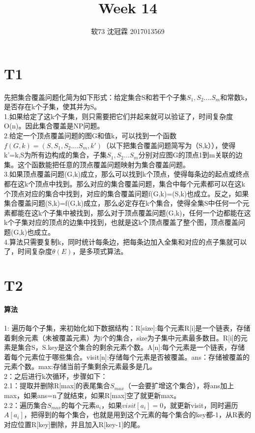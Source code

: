 \documentclass{article}
\title{Week 14}
\author{软73 沈冠霖 2017013569}
\begin{document}
\begin{CJK}{UTF8}{gkai}
\maketitle
\section{T1}
先把集合覆盖问题化简为如下形式：给定集合S和若干个子集$S_{1},S_{2}....S_{m}$和常数k，是否存在k个子集，使其并为S。\\
1.如果给定了这k个子集，则只需要把它们并起来就可以验证了，时间复杂度O(n)。因此集合覆盖是NP问题。\\
2.给定一个顶点覆盖问题的图G和值k，可以找到一个函数$f(G,k)=(S,S_{1},S_{2}....S_{m},k')$（以下把集合覆盖问题简写为（S,k）），使得k'=k,S为所有边构成的集合，子集$S_{1},S_{2}...S_{m}$分别对应图G的顶点1到m关联的边集。这个函数能把任意的顶点覆盖问题映射为集合覆盖问题。\\
3.如果顶点覆盖问题(G,k)成立，那么可以找到k个顶点，使得每条边的起点或终点都在这k个顶点中找到。那么对应的集合覆盖问题，集合中每个元素都可以在这k个顶点对应的集合中找到，对应的集合覆盖问题f(G,k)=(S,k)也成立。反之，如果集合覆盖问题(S,k)=f(G,k)成立，那么必定存在k个集合，使得全集S中任何一个元素都能在这k个子集中被找到，那么对于顶点覆盖问题(G,k)，任何一个边都能在这k个子集对应的顶点的边集中找到，也就是这k个顶点覆盖了整个图，顶点覆盖问题(G,k)也成立。\\
4.算法只需要复制k，同时统计每条边，把每条边加入全集和对应的点子集就可以了，时间复杂度$\theta(E)$，是多项式算法。
\section{T2}
\paragraph{算法}
1: 遍历每个子集，来初始化如下数据结构：R[size]:每个元素R[i]是一个链表，存储着剩余元素（未被覆盖元素）为i个的集合，size为子集中元素最多数目。R[i]的元素是集合S，S.key是这个集合的剩余元素个数。A[n]:每个元素是一个链表，存储着每个元素位于哪些集合。visit[n]:存储每个元素是否被覆盖。ans：存储被覆盖的元素个数。max:存储当前子集剩余元素最多是几。\\
2：之后进行k次循环，步骤如下：\\
2.1：提取并删除R[max]的表尾集合$S_{max}$（一会要扩增这个集合），将ans加上max，如果ans=n了就结束，如果R[max]空了就更新max。\\
2.2：遍历集合$S_{max}$的每个元素$a_{i}$，如果$visit[a_{i}]=0$，就更新visit，同时遍历$A[a_{i}]$，把得到的每个集合，也就是用到这个元素的每个集合的key都-1，从R表的对应位置R[key]删除，并且加入R[key-1]的尾。

\end{CJK}
\end{document}
